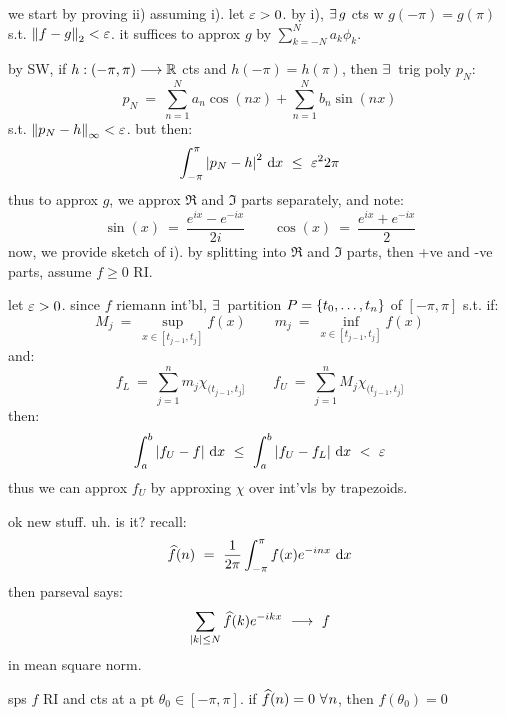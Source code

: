 \begin{pf}
	we start by proving ii) assuming i).
	let $\varepsilon>0$. by i), $\ex g$ cts w $g(-\pi)=g(\pi)$ s.t. $\left\|f-g\right\|_{2}<\varepsilon$.
	it suffices to approx $g$ by $\sum_{k=-N}^{N}a_{k}\phi_{k}$.

	by SW, if $h:(-\pi,\pi)\longrightarrow\mathbb{R}$ cts and $h(-\pi)=h(\pi)$, then
	$\ex$ trig poly $p_{N}$:
	\begin{equation*}
		p_{N} \ = \ \sum_{n=1}^{N}a_{n}\cos(nx) + \sum_{n=1}^{N}b_{n}\sin(nx)
	\end{equation*}
	s.t. $\left\|p_{N}-h\right\|_{\infty}<\varepsilon$.
	but then:
	\begin{equation*}
		\int_{-\pi}^{\pi}\abs{p_{N}-h}^{2}\di x \ \leq \ \ep^{2}2\pi
	\end{equation*}
	thus to approx $g$, we approx $\Re$ and $\Im$ parts separately, and note:
	\begin{equation*}
		\sin(x) \ = \ \frac{e^{ix}-e^{-ix}}{2i} \qquad
		\cos(x) \ = \ \frac{e^{ix}+e^{-ix}}{2}
	\end{equation*}
	now, we provide sketch of i).
	by splitting into $\Re$ and $\Im$ parts, then +ve and -ve parts,
	assume $f\geq0$ RI.

	let $\varepsilon>0$.
	since $f$ riemann int'bl, $\ex$ partition $P=\left\{{t_{0},\dots,t_{n}}\right\}$ of $[-\pi,\pi]$ s.t. if:
	\begin{equation*}
		M_{j} \ = \ \sup_{x\in[t_{j-1},t_{j}]}f(x) \qquad
		m_{j} \ = \ \inf_{x\in[t_{j-1},t_{j}]}f(x)
	\end{equation*}
	and:
	\begin{equation*}
		f_{L} \ = \ \sum_{j=1}^{n}m_{j}\chi_{(t_{j-1},t_{j}]} \qquad
		f_{U} \ = \ \sum_{j=1}^{n}M_{j}\chi_{(t_{j-1},t_{j}]}
	\end{equation*}
	then:
	\begin{equation*}
		\int_{a}^{b}\abs{f_{U}-f}\textrm{ d} x \ \leq \ \int_{a}^{b}\abs{f_{U}-f_{L}}\textrm{ d} x \ < \ \varepsilon
	\end{equation*}
	thus we can approx $f_{U}$ by approxing $\chi$ over int'vls by trapezoids.
\end{pf}
ok new stuff. uh. is it? recall:
\begin{equation*}
	\hat{f}(n) \ = \ \frac{1}{2\pi}\int_{-\pi}^{\pi}f(x)e^{-inx}\di x
\end{equation*}
then parseval says:
\begin{equation*}
	\sum_{\abs{k}\leq N}\widehat{f}(k)e^{-ikx} \ \longrightarrow \ f
\end{equation*}
in mean square norm.

\begin{thm}
	sps $f$ RI and cts at a pt $\theta_{0}\in[-\pi,\pi]$.
	if $\hat{f}(n)=0 \ \fa n$, then $f(\theta_{0})=0$
\end{thm} \

